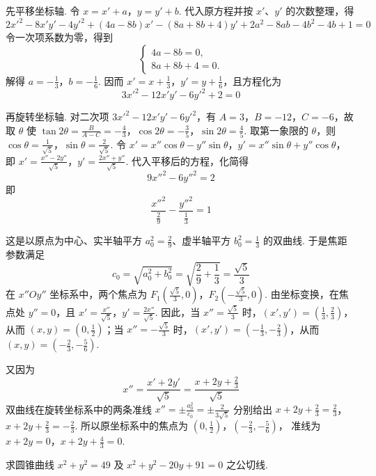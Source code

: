 \begin{solution}
先平移坐标轴. 令
\(x=x'+a\)，\(y=y'+b\).
代入原方程并按 \(x'\)、\(y'\) 的次数整理，得
\[
2x'^{2}-8x'y'-4y'^{2}+(4a-8b)x'-(8a+8b+4)y'+2a^{2}-8ab-4b^{2}-4b+1=0
\]
令一次项系数为零，得到
\[
\begin{cases}
4a-8b=0,\\
8a+8b+4=0.
\end{cases}
\]
解得 \(a=-\frac{1}{3}\)，\(b=-\frac{1}{6}\). 因而
\(x'=x+\frac{1}{3}\)，\(y'=y+\frac{1}{6}\)，且方程化为
\[
3x'^{2}-12x'y'-6y'^{2}+2=0
\]

再旋转坐标轴. 对二次项 \(3x'^{2}-12x'y'-6y'^{2}\)，有
\(A=3\)，\(B=-12\)，\(C=-6\)，故取 \(\theta\) 使
\(\tan2\theta=\frac{B}{A-C}=-\frac{4}{3}\)，\(\cos2\theta=-\frac{3}{5}\)，\(\sin2\theta=\frac{4}{5}\).
取第一象限的 \(\theta\)，则
\(\cos\theta=\frac{1}{\sqrt5}\)，\(\sin\theta=\frac{2}{\sqrt5}\).
令
\(x'=x''\cos\theta-y''\sin\theta\)，\(y'=x''\sin\theta+y''\cos\theta\)，
即
\(x'=\frac{x''-2y''}{\sqrt5}\)，\(y'=\frac{2x''+y''}{\sqrt5}\).
代入平移后的方程，化简得
\[
9x''^{2}-6y''^{2}=2
\]
即
\[
\frac{x''^{2}}{\frac{2}{9}}-\frac{y''^{2}}{\frac{1}{3}}=1
\]

这是以原点为中心、实半轴平方 \(a_{0}^{2}=\frac{2}{9}\)、虚半轴平方 \(b_{0}^{2}=\frac{1}{3}\) 的双曲线. 于是焦距参数满足
\[
c_{0}=\sqrt{a_{0}^{2}+b_{0}^{2}}=\sqrt{\frac{2}{9}+\frac{1}{3}}=\frac{\sqrt5}{3}
\]
在 \(x''Oy''\) 坐标系中，两个焦点为
\(F_{1}\left(\frac{\sqrt5}{3},0\right)\)，\(F_{2}\left(-\frac{\sqrt5}{3},0\right)\).
由坐标变换，在焦点处 \(y''=0\)，且
\(x'=\frac{x''}{\sqrt5}\)，\(y'=\frac{2x''}{\sqrt5}\).
因此，当 \(x''=\frac{\sqrt5}{3}\) 时，\((x',y')=\left(\frac{1}{3},\frac{2}{3}\right)\)，从而
\((x,y)=\left(0,\frac{1}{2}\right)\)；当 \(x''=-\frac{\sqrt5}{3}\) 时，\((x',y')=\left(-\frac{1}{3},-\frac{2}{3}\right)\)，从而
\((x,y)=\left(-\frac{2}{3},-\frac{5}{6}\right)\).

又因为
\[
x''=\frac{x'+2y'}{\sqrt5}=\frac{x+2y+\frac{2}{3}}{\sqrt5}
\]
双曲线在旋转坐标系中的两条准线
\(x''=\pm\frac{a_{0}^{2}}{c_{0}}=\pm\frac{2}{3\sqrt5}\) 分别给出
\(x+2y+\frac{2}{3}=\frac{2}{3}\)，\(x+2y+\frac{2}{3}=-\frac{2}{3}\).
所以原坐标系中的焦点为
\(\left(0,\frac{1}{2}\right)\)，\(\left(-\frac{2}{3},-\frac{5}{6}\right)\)，
准线为
\(x+2y=0\)，\(x+2y+\frac{4}{3}=0\).
\end{solution}

\begin{problem}
求圆锥曲线 \(x^{2}+y^{2}=49\) 及 \(x^{2}+y^{2}-20y+91=0\) 之公切线.
\end{problem}


